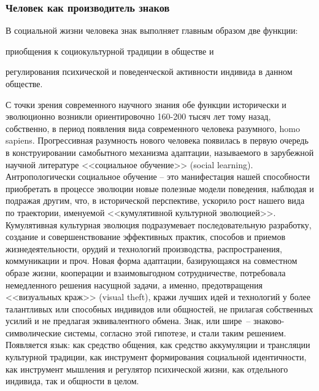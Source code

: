\subsubsection{Человек как производитель знаков}
\label{2.1}
В социальной жизни человека знак выполняет главным образом две
функции:
\begin{enumerate*}[label=\asbuk*)]
    \item приобщения к социокультурной традиции в обществе и
    \item регулирования психической и поведенческой активности индивида в
данном обществе.
\end{enumerate*}
С точки зрения современного научного знания обе
функции исторически и эволюционно возникли ориентировочно 160-200
тысяч лет тому назад, собственно, в период появления вида современного
человека разумного, homo sapiens.\autocite{pagel2012wired} Прогрессивная
разумность нового человека появилась в первую очередь в
конструировании самобытного механизма адаптации, называемого в
зарубежной научной литературе <<социальное обучение>>
(social learning).\autocite{ormrod1999human}\autocite{miller2010theories}\autocite{online:sociallearning}
Антропологически социальное обучение -- это манифестация
нашей способности приобретать в процессе эволюции новые полезные
модели поведения, наблюдая и подражая другим, что, в исторической
перспективе, ускорило рост нашего вида по траектории, именуемой
<<кумулятивной культурной эволюцией>>. Кумулятивная культурная
эволюция подразумевает последовательную разработку, создание и
совершенствование эффективных практик, способов и приемов
жизнедеятельности, орудий и технологий производства, распространения,
коммуникации и проч. Новая форма адаптации, базирующаяся на
совместном образе жизни, кооперации и взаимовыгодном сотрудничестве,
потребовала немедленного решения насущной задачи, а именно,
предотвращения <<визуальных краж>> (visual theft), кражи лучших идей и
технологий у более талантливых или способных индивидов или общностей,
не прилагая собственных усилий и не предлагая эквивалентного обмена.\autocite{pagel2012wired}
Знак, или шире~-- знаково-символические системы, согласно этой
гипотезе, и стали таким решением. Появляется язык: как средство общения,
как средство аккумуляции и трансляции культурной традиции, как
инструмент формирования социальной идентичности, как инструмент
мышления и регулятор психической жизни, как отдельного индивида, так и
общности в целом.

